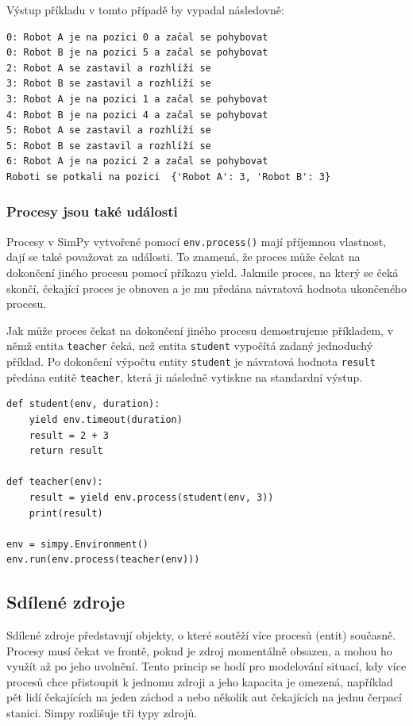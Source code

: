 \documentclass[
  program=itp,
  biblatex,
  figures=false,
  glossaries,
  index
]{kidiplom}
\begin{document}
\noindent Výstup příkladu v tomto případě by vypadal následovně:

\begin{verbatim}
0: Robot A je na pozici 0 a začal se pohybovat
0: Robot B je na pozici 5 a začal se pohybovat
2: Robot A se zastavil a rozhlíží se
3: Robot B se zastavil a rozhlíží se
3: Robot A je na pozici 1 a začal se pohybovat
4: Robot B je na pozici 4 a začal se pohybovat
5: Robot A se zastavil a rozhlíží se
5: Robot B se zastavil a rozhlíží se
6: Robot A je na pozici 2 a začal se pohybovat
Roboti se potkali na pozici  {'Robot A': 3, 'Robot B': 3}
\end{verbatim}

\subsubsection{Procesy jsou také události}
Procesy v SimPy vytvořené pomocí \texttt{env.process()} mají příjemnou vlastnost, dají se také považovat za události. To znamená, že proces může čekat na dokončení jiného procesu pomocí příkazu yield. Jakmile proces, na který se čeká skončí, čekající proces je obnoven a je mu předána návratová hodnota ukončeného procesu.

Jak může proces čekat na dokončení jiného procesu demostrujeme příkladem, v němž entita \texttt{teacher} čeká, než entita \texttt{student} vypočítá zadaný jednoduchý příklad. Po dokončení výpočtu entity \texttt{student} je návratová hodnota \texttt{result} předána entitě \texttt{teacher}, která ji následně vytiskne na standardní výstup. 

\begin{verbatim}
def student(env, duration):
    yield env.timeout(duration)
    result = 2 + 3
    return result

def teacher(env):
    result = yield env.process(student(env, 3))
    print(result)

env = simpy.Environment()
env.run(env.process(teacher(env)))
\end{verbatim}

\subsection{Sdílené zdroje}

Sdílené zdroje představují objekty, o které soutěží více procesů (entit) současně. Procesy musí čekat ve frontě, pokud je zdroj momentálně obsazen, a mohou ho využít až po jeho uvolnění. Tento princip se hodí pro modelování situací, kdy více procesů chce přistoupit k jednomu zdroji a jeho kapacita je omezená, například pět lidí čekajících na jeden záchod a nebo několik aut čekajících na jednu čerpací stanici. Simpy rozlišuje tři typy zdrojů.
\end{document}
